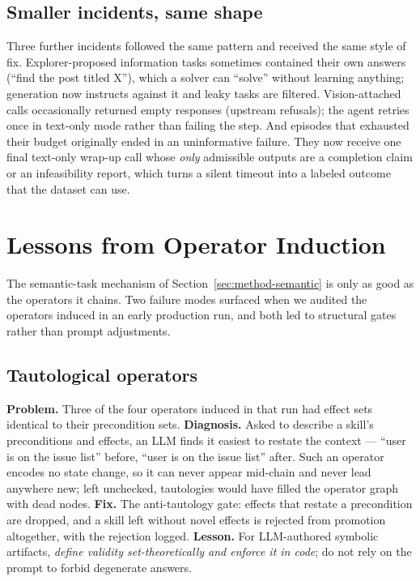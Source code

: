 \subsection{Smaller incidents, same shape}

Three further incidents followed the same pattern and received the same style
of fix. Explorer-proposed information tasks sometimes contained their own
answers (``find the post titled X''), which a solver can ``solve'' without
learning anything; generation now instructs against it and leaky tasks are
filtered. Vision-attached calls occasionally returned empty responses
(upstream refusals); the agent retries once in text-only mode rather than
failing the step. And episodes that exhausted their budget originally ended
in an uninformative failure. They now receive one final text-only wrap-up
call whose \emph{only} admissible outputs are a completion claim or an
infeasibility report, which turns a silent timeout into a labeled outcome
that the dataset can use.

\section{Lessons from Operator Induction}
\label{sec:disc-operators}

The semantic-task mechanism of Section~\ref{sec:method-semantic} is only as
good as the operators it chains. Two failure modes surfaced when we audited
the operators induced in an early production run, and both led to structural
gates rather than prompt adjustments.

\subsection{Tautological operators}

\textbf{Problem.} Three of the four operators induced in that run had effect
sets identical to their precondition sets.
\textbf{Diagnosis.} Asked to describe a skill's preconditions and effects,
an LLM finds it easiest to restate the context --- ``user is on the issue
list'' before, ``user is on the issue list'' after. Such an operator encodes
no state change, so it can never appear mid-chain and never lead anywhere
new; left unchecked, tautologies would have filled the operator graph with
dead nodes.
\textbf{Fix.} The anti-tautology gate: effects that restate a precondition
are dropped, and a skill left without novel effects is rejected from
promotion altogether, with the rejection logged.
\textbf{Lesson.} For LLM-authored symbolic artifacts, \emph{define validity
set-theoretically and enforce it in code}; do not rely on the prompt to
forbid degenerate answers.

